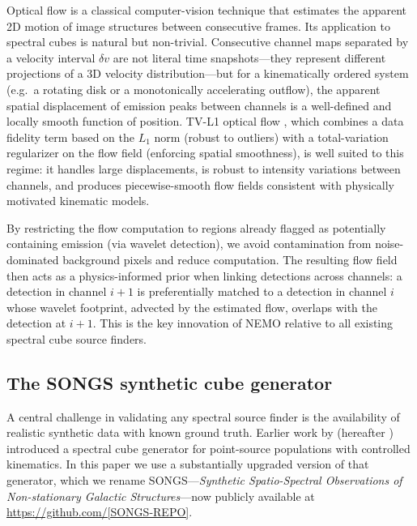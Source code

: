 \documentclass{aa}
\begin{document}
Optical flow \citep{HornSchunck1981,...} is a classical computer-vision technique that estimates the apparent 2D motion of image structures between consecutive frames. Its application to spectral cubes is natural but non-trivial. Consecutive channel maps separated by a velocity interval $\delta v$ are not literal time snapshots---they represent different projections of a 3D velocity distribution---but for a kinematically ordered system (e.g.\ a rotating disk or a monotonically accelerating outflow), the apparent spatial displacement of emission peaks between channels is a well-defined and locally smooth function of position. TV-L1 optical flow \citep{Zach2007,...}, which combines a data fidelity term based on the $L_1$ norm (robust to outliers) with a total-variation regularizer on the flow field (enforcing spatial smoothness), is well suited to this regime: it handles large displacements, is robust to intensity variations between channels, and produces piecewise-smooth flow fields consistent with physically motivated kinematic models.

By restricting the flow computation to regions already flagged as potentially containing emission (via wavelet detection), we avoid contamination from noise-dominated background pixels and reduce computation. The resulting flow field then acts as a physics-informed prior when linking detections across channels: a detection in channel $i+1$ is preferentially matched to a detection in channel $i$ whose wavelet footprint, advected by the estimated flow, overlaps with the detection at $i+1$. This is the key innovation of NEMO relative to all existing spectral cube source finders.

\subsection{The SONGS synthetic cube generator}
\label{sec:intro_songs}

A central challenge in validating any spectral source finder is the availability of realistic synthetic data with known ground truth. Earlier work by \citet{Lahiry+2024} (hereafter ) introduced a spectral cube generator for point-source populations with controlled kinematics. In this paper we use a substantially upgraded version of that generator, which we rename SONGS---\textit{Synthetic Spatio-Spectral Observations of Non-stationary Galactic Structures}---now publicly available at \url{https://github.com/[SONGS-REPO]}.
\end{document}
